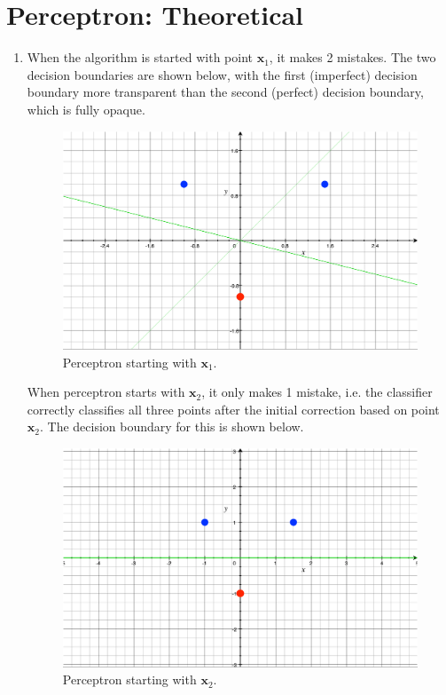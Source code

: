 \documentclass{article}
\begin{document}

\section{Perceptron: Theoretical}

\begin{enumerate}
	\item When the algorithm is started with point $\mathbf{x}_1$, it makes 2 mistakes. The two decision boundaries are shown below, with the first (imperfect) decision boundary more transparent than the second (perfect) decision boundary, which is fully opaque.
		\begin{figure}[H]
			\centering
			\includegraphics[scale=0.4]{fig/a1.pdf}
			\caption{Perceptron starting with $\mathbf{x}_1$.}
		\end{figure}

		When perceptron starts with $\mathbf{x}_2$, it only makes 1 mistake, i.e. the classifier correctly classifies all three points after the initial correction based on point $\mathbf{x}_2$. The decision boundary for this is shown below.
		\begin{figure}[H]
			\centering
			\includegraphics[scale=0.4]{fig/a2.pdf}
			\caption{Perceptron starting with $\mathbf{x}_2$.}
		\end{figure}
		


\end{enumerate}
\end{document}
